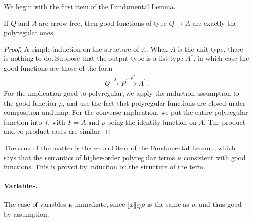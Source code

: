 We begin with the first item of the Fundamental Lemma.
\begin{lemma}\label{lem:good-functions-are-polyregular-at-arrow-free-types}
    If $Q$ and $A$ are arrow-free, then good functions of type $Q \to A$ are exactly the polyregular ones.
\end{lemma}
\begin{proof}
    A simple induction on the structure of $A$. When $A$ is the unit type, there is nothing to do. Suppose that the output type is a list type  $A^*$, in which case the good functions are those of the form 
    \begin{align*}
    Q \xrightarrow f  P^* \xrightarrow {\rho^*} A^*.
    \end{align*}
    For the implication good-to-polyregular, we apply the induction assumption to the good function $\rho$, and use the fact that polyregular functions are closed under composition and map. For the converse implication, we put the entire polyregular function into $f$, with $P=A$ and $\rho$ being the identity function on $A$. The product and co-product cases are similar.
\end{proof}

The crux of the matter is the second item of the Fundamental Lemma, which says that the semantics of higher-order polyregular terms is consistent with good functions. This is proved by induction on the structure of the term.


\newcommand{\fundlemlogrel}[2]{\sem{#1}_{#2}}



\paragraph*{Variables.} The case of variables is immediate, since $[\![x]\!]_{Q} \rho$ is the same as $\rho$, and thus good by assumption. 

